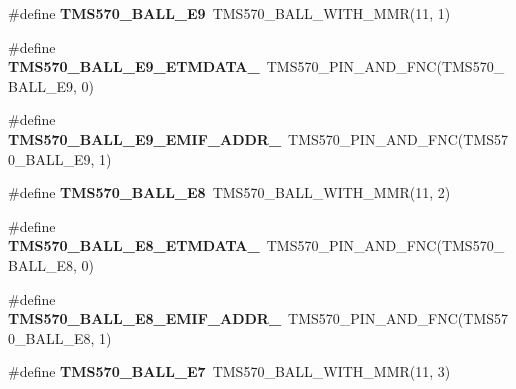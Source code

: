 \begin{DoxyCompactItemize}
\item 
\mbox{\label{tms570lc4357-pins_8h_aba898eac2e739d9a6e4de0a8b4988425}} 
\#define {\bfseries T\+M\+S570\+\_\+\+B\+A\+L\+L\+\_\+\+E9}~T\+M\+S570\+\_\+\+B\+A\+L\+L\+\_\+\+W\+I\+T\+H\+\_\+\+M\+MR(11, 1)
\item 
\mbox{\label{tms570lc4357-pins_8h_af07c9ff71b9ac9ae52d121c9dbef9fe6}} 
\#define {\bfseries T\+M\+S570\+\_\+\+B\+A\+L\+L\+\_\+\+E9\+\_\+\+E\+T\+M\+D\+A\+T\+A\+\_}~T\+M\+S570\+\_\+\+P\+I\+N\+\_\+\+A\+N\+D\+\_\+\+F\+NC(T\+M\+S570\+\_\+\+B\+A\+L\+L\+\_\+\+E9, 0)
\item 
\mbox{\label{tms570lc4357-pins_8h_a84457461217b3929e00b702642f8e28a}} 
\#define {\bfseries T\+M\+S570\+\_\+\+B\+A\+L\+L\+\_\+\+E9\+\_\+\+E\+M\+I\+F\+\_\+\+A\+D\+D\+R\+\_}~T\+M\+S570\+\_\+\+P\+I\+N\+\_\+\+A\+N\+D\+\_\+\+F\+NC(T\+M\+S570\+\_\+\+B\+A\+L\+L\+\_\+\+E9, 1)
\item 
\mbox{\label{tms570lc4357-pins_8h_aa6822761c614c984df1bd994c5e622f3}} 
\#define {\bfseries T\+M\+S570\+\_\+\+B\+A\+L\+L\+\_\+\+E8}~T\+M\+S570\+\_\+\+B\+A\+L\+L\+\_\+\+W\+I\+T\+H\+\_\+\+M\+MR(11, 2)
\item 
\mbox{\label{tms570lc4357-pins_8h_a8d7d413457735c51e4af73169cdf110e}} 
\#define {\bfseries T\+M\+S570\+\_\+\+B\+A\+L\+L\+\_\+\+E8\+\_\+\+E\+T\+M\+D\+A\+T\+A\+\_}~T\+M\+S570\+\_\+\+P\+I\+N\+\_\+\+A\+N\+D\+\_\+\+F\+NC(T\+M\+S570\+\_\+\+B\+A\+L\+L\+\_\+\+E8, 0)
\item 
\mbox{\label{tms570lc4357-pins_8h_acce29b1a6ae604a02fc920a874b87fe2}} 
\#define {\bfseries T\+M\+S570\+\_\+\+B\+A\+L\+L\+\_\+\+E8\+\_\+\+E\+M\+I\+F\+\_\+\+A\+D\+D\+R\+\_}~T\+M\+S570\+\_\+\+P\+I\+N\+\_\+\+A\+N\+D\+\_\+\+F\+NC(T\+M\+S570\+\_\+\+B\+A\+L\+L\+\_\+\+E8, 1)
\item 
\mbox{\label{tms570lc4357-pins_8h_ab74766021e0ebf5856d54b7101ab3e7d}} 
\#define {\bfseries T\+M\+S570\+\_\+\+B\+A\+L\+L\+\_\+\+E7}~T\+M\+S570\+\_\+\+B\+A\+L\+L\+\_\+\+W\+I\+T\+H\+\_\+\+M\+MR(11, 3)
\item 
\mbox{\label{tms570lc4357-pins_8h_a7b6f23ca2acdb459da0ee89d78a192d3}} 

\end{DoxyCompactItemize}
